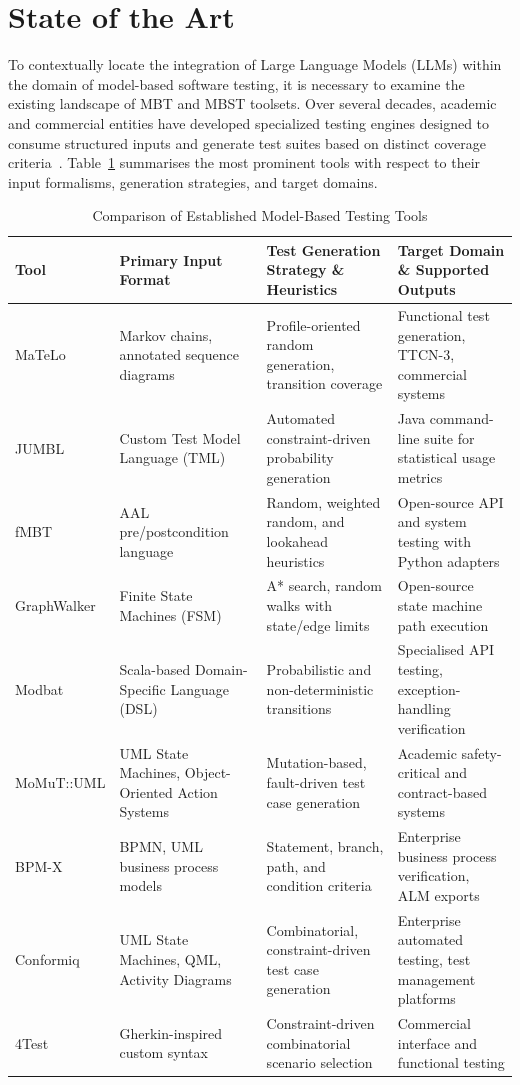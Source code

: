 \section{State of the Art}%
\label{sec:related_work}

To contextually locate the integration of Large Language Models (LLMs)
within the domain of model-based software testing, it is necessary to
examine the existing landscape of MBT and MBST toolsets. Over several
decades, academic and commercial entities have developed specialized
testing engines designed to consume structured inputs and generate test
suites based on distinct coverage criteria~\cite{taxonomy_mbt,
mbt_tools_approach}. Table~\ref{tab:mbt_tools} summarises the most
prominent tools with respect to their input formalisms, generation
strategies, and target domains.

\begin{table}[!t]
\centering
\caption{Comparison of Established Model-Based Testing Tools}%
\label{tab:mbt_tools}
\renewcommand{\arraystretch}{1.15}
\begin{tabular}{p{2.0cm} p{3.8cm} p{4.8cm} p{4.8cm}}
\hline\hline
\textbf{Tool} &
\textbf{Primary Input Format} &
\textbf{Test Generation Strategy \& Heuristics} &
\textbf{Target Domain \& Supported Outputs} \\
\hline
MaTeLo &
Markov chains, annotated sequence diagrams &
Profile-oriented random generation, transition coverage &
Functional test generation, TTCN-3, commercial systems \\
\hline
JUMBL &
Custom Test Model Language (TML) &
Automated constraint-driven probability generation &
Java command-line suite for statistical usage metrics \\
\hline
fMBT &
AAL pre/postcondition language &
Random, weighted random, and lookahead heuristics &
Open-source API and system testing with Python adapters \\
\hline
GraphWalker &
Finite State Machines (FSM) &
A* search, random walks with state/edge limits &
Open-source state machine path execution \\
\hline
Modbat &
Scala-based Domain-Specific Language (DSL) &
Probabilistic and non-deterministic transitions &
Specialised API testing, exception-handling verification \\
\hline
MoMuT::UML &
UML State Machines, Object-Oriented Action Systems &
Mutation-based, fault-driven test case generation &
Academic safety-critical and contract-based systems \\
\hline
BPM-X &
BPMN, UML business process models &
Statement, branch, path, and condition criteria &
Enterprise business process verification, ALM exports \\
\hline
Conformiq &
UML State Machines, QML, Activity Diagrams &
Combinatorial, constraint-driven test case generation &
Enterprise automated testing, test management platforms \\
\hline
4Test &
Gherkin-inspired custom syntax &
Constraint-driven combinatorial scenario selection &
Commercial interface and functional testing \\
\hline\hline
\end{tabular}
\end{table}

